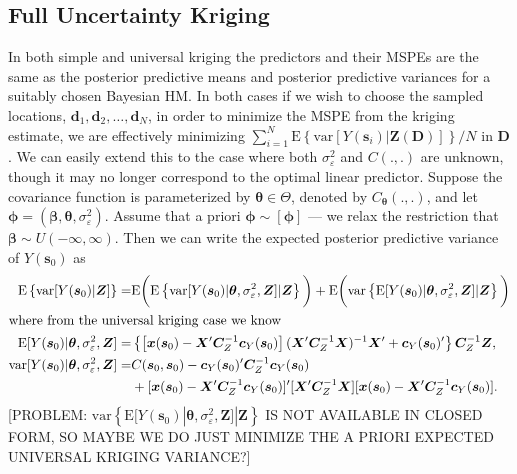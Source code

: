 \documentclass[12pt]{article}
\begin{document}
\subsection{Full Uncertainty Kriging}
In both simple and universal kriging the predictors and their MSPEs are the same as the posterior predictive means and posterior predictive variances for a suitably chosen Bayesian HM. In both cases if we wish to choose the sampled locations, $\bm{d}_1,\bm{d}_2,\dots,\bm{d}_N$, in order to minimize the MSPE from the kriging estimate, we are effectively minimizing $\sum_{i=1}^N\mathrm{E}\left\{\mathrm{var}[Y(\bm{s}_i)|\bm{Z}(\bm{D})]\right\}/N$ in $\bm{D}$. We can easily extend this to the case where both $\sigma^2_{\varepsilon}$ and $C(.,.)$ are unknown, though it may no longer correspond to the optimal linear predictor. Suppose the covariance function is parameterized by $\bm{\theta}\in\Theta$, denoted by $C_{\bm{\theta}}(.,.)$, and let $\bm{\phi} = (\bm{\beta}, \bm{\theta}, \sigma^2_{\varepsilon})$. Assume that a priori $\bm{\phi}\sim [\bm{\phi}]$ --- we relax the restriction that $\bm{\beta}\sim U(-\infty, \infty)$. Then we can write the expected posterior predictive variance of $Y(\bm{s}_0)$ as
\begin{align*}
\mathrm{E}\left\{\mathrm{var}[Y(\bm{s}_0)|\bm{Z}]\right\} =& \mathrm{E}\bigg(\mathrm{E}\left\{\mathrm{var}[Y(\bm{s}_0)|\bm{\theta},\sigma^2_{\varepsilon},\bm{Z}]|\bm{Z}\right\}\bigg) + \mathrm{E}\bigg(\mathrm{var}\left\{\mathrm{E}[Y(\bm{s}_0)|\bm{\theta},\sigma^2_{\varepsilon},\bm{Z}]|\bm{Z}\right\}\bigg)\\
\intertext{where from the universal kriging case we know}
\mathrm{E}[Y(\bm{s}_0)|\bm{\theta},\sigma^2_{\varepsilon},\bm{Z}] =&\left\{\left[\bm{x}(\bm{s}_0) - \bm{X}'\bm{C}_Z^{-1}\bm{c}_Y(\bm{s}_0)\right](\bm{X}'\bm{C}_Z^{-1}\bm{X})^{-1}\bm{X}' + \bm{c}_Y(\bm{s}_0)'\right\}\bm{C}_Z^{-1}\bm{Z},\\
\mathrm{var}[Y(\bm{s}_0)|\bm{\theta},\sigma^2_{\varepsilon},\bm{Z}] =&C(\bm{s}_0, \bm{s}_0) - \bm{c}_Y(\bm{s}_0)'\bm{C}_Z^{-1}\bm{c}_Y(\bm{s}_0) \\
&+ [\bm{x}(\bm{s}_0) - \bm{X}'\bm{C}_Z^{-1}\bm{c}_Y(\bm{s}_0)]'[\bm{X}'\bm{C}_Z^{-1}\bm{X}][\bm{x}(\bm{s}_0) - \bm{X}'\bm{C}_Z^{-1}\bm{c}_Y(\bm{s}_0)].
\end{align*}
[PROBLEM: $\mathrm{var}\left\{\mathrm{E}[Y(\bm{s}_0)|\bm{\theta},\sigma^2_{\varepsilon},\bm{Z}]|\bm{Z}\right\}$ IS NOT AVAILABLE IN CLOSED FORM, SO MAYBE WE DO JUST MINIMIZE THE A PRIORI EXPECTED UNIVERSAL KRIGING VARIANCE?]


\clearpage\pagebreak\newpage\thispagestyle{empty}
%
\end{document}
